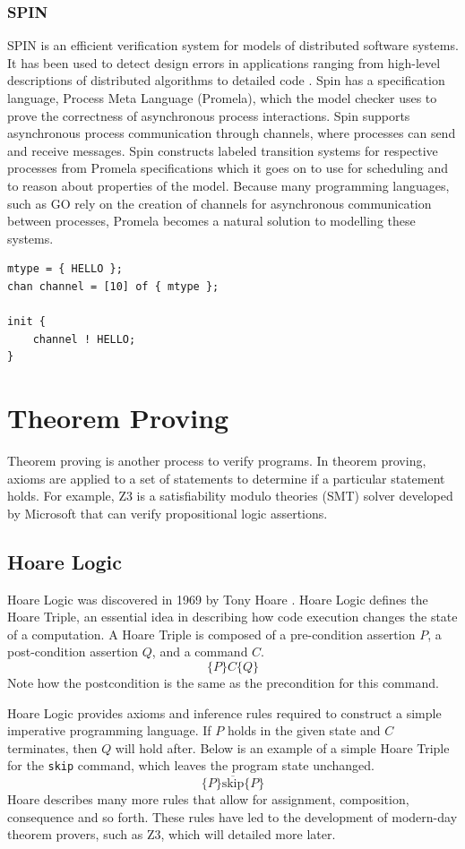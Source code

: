 \subsubsection*{\textbf{SPIN}}
SPIN is an efficient verification system for models of distributed software systems. It has been used to detect design errors in applications ranging from high-level descriptions of distributed algorithms to detailed code \cite{spin}. Spin has a specification language, Process Meta Language (Promela), which the model checker uses to prove the correctness of asynchronous process interactions. Spin supports asynchronous process communication through channels, where processes can send and receive messages. Spin constructs labeled transition systems for respective processes from Promela specifications which it goes on to use for scheduling and to reason about properties of the model. Because many programming languages, such as GO \cite{go} rely on the creation of channels for asynchronous communication between processes, Promela becomes a natural solution to modelling these systems.
\begin{lstlisting}[caption={Example of a Promela specification that enqueues a message in a channel}]
mtype = { HELLO };
chan channel = [10] of { mtype };

init {
    channel ! HELLO;
}
\end{lstlisting}

\section{Theorem Proving}
Theorem proving is another process to verify programs. In theorem proving, axioms are applied to a set of statements to determine if a particular statement holds. For example, Z3 \cite{z3} is a satisfiability modulo theories (SMT) solver developed by Microsoft that can verify propositional logic assertions.
\subsection{Hoare Logic}
Hoare Logic was discovered in 1969 by Tony Hoare \cite{hoare_logic}. Hoare Logic defines the Hoare Triple, an essential idea in describing how code execution changes the state of a computation. A Hoare Triple is composed of a pre-condition assertion $P$, a post-condition assertion $Q$, and a command $C$.
\[
\{P\}C\{Q\}
\]
Note how the postcondition is the same as the precondition for this command.
\par
Hoare Logic provides axioms and inference rules required to construct a simple imperative programming language. If $P$ holds in the given state and $C$ terminates, then $Q$ will hold after. Below is an example of a simple Hoare Triple for the \texttt{skip} command, which leaves the program state unchanged.
\[
\overline{\{P\}\text{skip}\{P\}}
\]
Hoare describes many more rules that allow for assignment, composition, consequence and so forth. These rules have led to the development of modern-day theorem provers, such as Z3, which will detailed more later.
